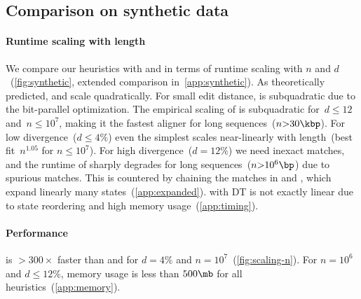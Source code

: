 \subsection{Comparison on synthetic data} \label{GLOBALsec:evals-comparison-synthetic}

\paragraph{Runtime scaling with length}
We compare our \A heuristics with \edlib and \wfa in terms of runtime scaling
with $n$ and $d$~(\cref{fig:synthetic}, extended comparison in~\cref{app:synthetic}).
%
As theoretically predicted, \edlib and \wfa scale quadratically. For small edit
distance, \edlib is subquadratic due to the bit-parallel optimization. The
empirical scaling of \astarpa is subquadratic for~$d{\leq}12$ and~$n{\le}10^7$,
making it the fastest aligner for long sequences~($n{>}30\kbp$).
%
For low divergence~($d{\leq}4\%$) even the simplest \SH scales near-linearly
with length~(best fit~$n^{1.05}$ for $n{\le}10^7$).
%
For high divergence~($d{=}12\%$) we need inexact matches, and the runtime of \SH
sharply degrades for long sequences~($n{>}10^6\bp$) due to spurious matches.
This is countered by chaining the matches in \CSH and \GCH, which
expand linearly many states~(\cref{app:expanded}).
\GCH with DT is not exactly linear due to state reordering and high
memory usage~(\cref{app:timing}).

\paragraph{Performance}
\astarpa is ${>}300\times$ faster than \edlib and \wfa for $d{=}4\%$ and
$n{=}10^7$~(\cref{fig:scaling-n}). For $n{=}10^6$ and $d{\leq}
12\%$, memory usage is less than $500\mb$ for all heuristics~(\cref{app:memory}).
